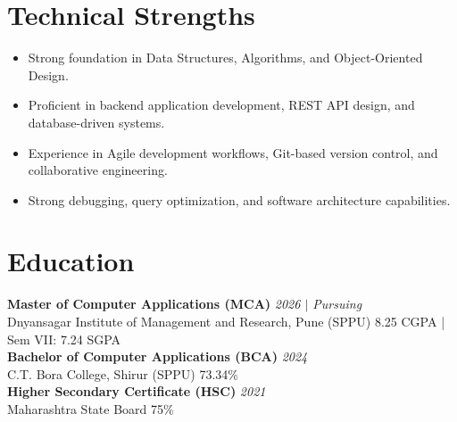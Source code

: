 \documentclass[10.5pt,a4paper]{article}
\begin{document}
\section{Technical Strengths}
\begin{itemize}
  \item Strong foundation in Data Structures, Algorithms, and Object-Oriented Design.
  \item Proficient in backend application development, REST API design, and database-driven systems.
  \item Experience in Agile development workflows, Git-based version control, and collaborative engineering.
  \item Strong debugging, query optimization, and software architecture capabilities.
\end{itemize}
\section{Education}
\textbf{Master of Computer Applications (MCA)} \hfill \textit{2026 $|$ Pursuing}\\
Dnyansagar Institute of Management and Research, Pune (SPPU) \hfill 8.25 CGPA | Sem VII: 7.24 SGPA\\[4pt]
\textbf{Bachelor of Computer Applications (BCA)} \hfill \textit{2024}\\
C.T. Bora College, Shirur (SPPU) \hfill 73.34\%\\[4pt]
\textbf{Higher Secondary Certificate (HSC)} \hfill \textit{2021}\\
Maharashtra State Board \hfill 75\%\\[4pt]
\end{document}
